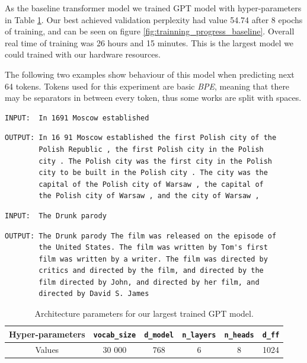 As the baseline transformer model we trained GPT model with hyper-parameters in Table \ref{tab:param_best}. Our best achieved validation perplexity had value 54.74 after 8 epochs of training, and can be seen on figure \ref{fig:trainning_progress_baseline}. Overall real time of training was 26 hours and 15 minutes. This is the largest model we could trained with our hardware resources.

The following two examples show behaviour of this model when predicting next 64 tokens. Tokens used for this experiment are basic \textit{BPE}, meaning that there may be separators in between every token, thus some works are split with spaces.\\
\begin{verbatim}
INPUT:  In 1691 Moscow established 
\end{verbatim}
\begin{verbatim}
OUTPUT: In 16 91 Moscow established the first Polish city of the
        Polish Republic , the first Polish city in the Polish 
        city . The Polish city was the first city in the Polish 
        city to be built in the Polish city . The city was the 
        capital of the Polish city of Warsaw , the capital of 
        the Polish city of Warsaw , and the city of Warsaw ,
\end{verbatim}

\begin{verbatim}
INPUT:  The Drunk parody
\end{verbatim}
\begin{verbatim}
OUTPUT: The Drunk parody The film was released on the episode of 
        the United States. The film was written by Tom's first 
        film was written by a writer. The film was directed by 
        critics and directed by the film, and directed by the 
        film directed by John, and directed by her film, and 
        directed by David S. James
\end{verbatim}

\begin{table}[H]
    \centering
    \begin{tabular}{|c|c|c|c|c|c|}
    \hline
    Hyper-parameters & \texttt{vocab\_size} &  \texttt{d\_model} & \texttt{n\_layers} & \texttt{n\_heads} & \texttt{d\_ff} \\ \hline
    Values & 30 000 & 768 & 6 & 8 & 1024\\ \hline
    \end{tabular}
    \caption{Architecture parameters for our largest trained GPT model.}
    \label{tab:param_best}
\end{table}


